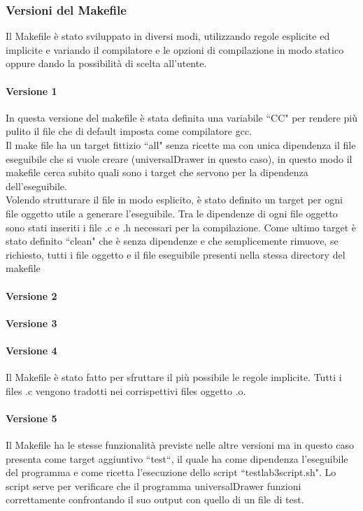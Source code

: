 \documentclass{article}
\begin{document}
	\subsubsection*{Versioni del Makefile}
		Il Makefile è stato sviluppato in diversi modi, utilizzando regole esplicite ed implicite e variando il compilatore
		e le opzioni di compilazione in modo statico oppure dando la possibilità di scelta all'utente.
		\paragraph*{Versione 1}
		In questa versione del makefile è stata definita una variabile ``CC" per rendere più pulito il file che di default imposta come compilatore gcc. \\
		Il make file ha un target fittizio ``all" senza ricette ma con unica dipendenza il file eseguibile che si vuole creare (universalDrawer in questo caso), in questo modo il makefile cerca subito quali sono i target che servono per la dipendenza dell'eseguibile. \\
		Volendo strutturare il file in modo esplicito, è stato definito un target per ogni file oggetto utile a generare l'eseguibile. Tra le dipendenze di ogni file oggetto sono stati inseriti i file .c e .h necessari per la compilazione.
		Come ultimo target è stato definito ``clean" che è senza dipendenze e che semplicemente rimuove, se richiesto, tutti i file oggetto e il file eseguibile presenti nella stessa directory del makefile 
		\paragraph*{Versione 2}
		\paragraph*{Versione 3}
		\paragraph*{Versione 4}
			Il Makefile è stato fatto per sfruttare il più possibile le regole implicite. Tutti i files .c vengono tradotti
			nei corrispettivi files oggetto .o.
		\paragraph*{Versione 5}
		Il Makefile ha le stesse funzionalità previste nelle altre versioni ma in questo caso presenta come target aggiuntivo ``test``, il quale ha come dipendenza l'eseguibile del programma e come ricetta l'esecuzione dello script ``test\textunderscore lab3\textunderscore script.sh". Lo script serve per verificare che il programma universalDrawer funzioni correttamente confrontando il suo output con quello di un file di test.
\end{document}
